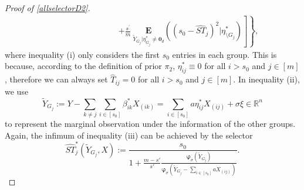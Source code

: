 \documentclass[12pt]{article}
\newtheorem{proof}{Proof}
\begin{document}
\begin{appendix}
\begin{proof}[Proof of \eqref{allselectorD2}]
\begin{align*}
    & \qquad\qquad\qquad\qquad \left.\left.+ \frac{s^\prime}{m}~\underset{\tilde Y_{G_j}|\eta_{G_j}^* \ne \mathbf0_d}{\mathbf E}
    \left( (s_0-\widehat{ST}_{j} )^2 \Big| \eta_{\setminus G_j}^*  \right) \right] \right\},
\end{align*}
where inequality (i) only considers the first $s_0$ entries in each group. 
This is because, according to the definition of prior $\pi_2$, $\eta_{ij}^* \equiv 0$ for all $ i>s_0$ and $j \in [m]$, therefore we can always set $\hat T_{ij} = 0$ for all $ i>s_0$ and $j \in [m]$.
In inequality (ii), we use
\begin{equation*}
\tilde Y_{G_j}:= Y - \sum_{k \ne j}\sum_{i \in[s_0]} \beta_{ik}^* X_{(ik)} = \sum_{i\in[s_0]} a \eta_{ij}^* X_{(ij)} + \sigma \xi \in \mathbb R^n
\end{equation*}
to represent the marginal observation under the information of the other groups.
Again, the infimum of inequality (iii) can be achieved by the selector
\begin{equation} 
\widehat{ST}_{j}^{*}(\tilde Y_{G_j},X) 
:=  \frac{s_0}{ 1+ \frac{m-s'}{s'} \frac {\boldsymbol \varphi_{\sigma}(\tilde Y_{G_j})}
    {\boldsymbol \varphi_{\sigma} \left( \tilde Y_{G_j}-\sum_{i\in [s_0]}a X_{(ij)}\right)} }.
\end{equation}


\end{proof}
\end{appendix}
\end{document}
